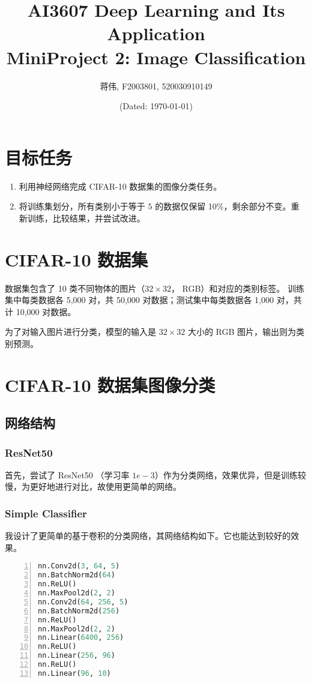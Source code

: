 \documentclass[a4paper]{article}
\title{AI3607 Deep Learning and Its Application\\MiniProject 2: Image Classification}
\author{\sffamily 蒋伟, F2003801, 520030910149}
\date{(Dated: \today)}
\begin{document}
\section{目标任务}
\begin{enumerate}
    \item 利用神经网络完成 CIFAR-10 数据集的图像分类任务。
    \item 将训练集划分，所有类别小于等于 $5$ 的数据仅保留 10\%，剩余部分不变。重新训练，比较结果，并尝试改进。
\end{enumerate}

\section{CIFAR-10 数据集}
数据集包含了 10 类不同物体的图片（$32\times 32$， RGB）和对应的类别标签。
训练集中每类数据各 5,000 对，共 50,000 对数据；测试集中每类数据各 1,000 对，共计 10,000 对数据。

为了对输入图片进行分类，模型的输入是 $32\times 32$ 大小的 RGB 图片，输出则为类别预测。

\section{CIFAR-10 数据集图像分类}
\subsection{网络结构}
\subsubsection{ResNet50}
首先，尝试了 ResNet50 \cite{resnet} （学习率 $1e-3$）作为分类网络，效果优异，但是训练较慢，为更好地进行对比，故使用更简单的网络。
\subsubsection{Simple Classifier}
我设计了更简单的基于卷积的分类网络，其网络结构如下。它也能达到较好的效果。

\begin{multicols}{2}
    \begin{lstlisting}[language=Python, basicstyle=\ttfamily, numbers=left]
nn.Conv2d(3, 64, 5)
nn.BatchNorm2d(64)
nn.ReLU()
nn.MaxPool2d(2, 2)
nn.Conv2d(64, 256, 5)
nn.BatchNorm2d(256)
nn.ReLU()
nn.MaxPool2d(2, 2)
nn.Linear(6400, 256)
nn.ReLU()
nn.Linear(256, 96)
nn.ReLU()
nn.Linear(96, 10)
    \end{lstlisting}
\end{multicols}
\end{document}
